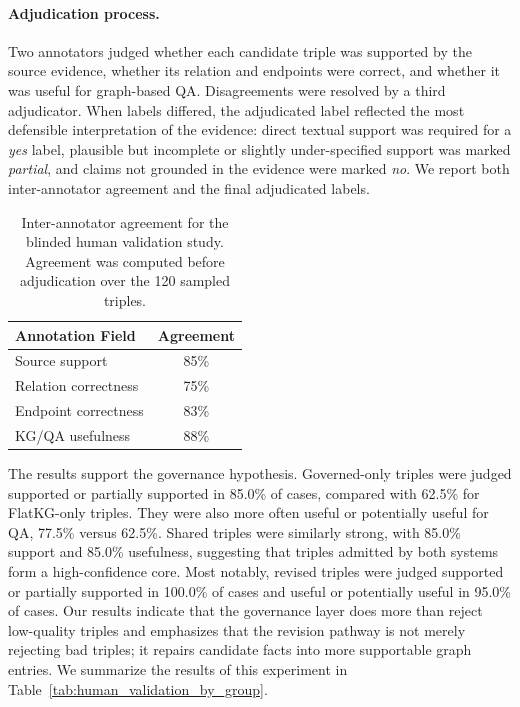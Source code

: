 \documentclass{article}
\begin{document}
\paragraph{Adjudication process.}
Two annotators judged whether each candidate triple was supported by the source evidence, whether its relation and endpoints were correct, and whether it was useful for graph-based QA. Disagreements were resolved by a third adjudicator. When labels differed, the adjudicated label reflected the most defensible interpretation of the evidence: direct textual support was required for a \emph{yes} label, plausible but incomplete or slightly under-specified support was marked \emph{partial}, and claims not grounded in the evidence were marked \emph{no}. We report both inter-annotator agreement and the final adjudicated labels.

\begin{table}[t]
    \centering
    \small
    \caption{
    Inter-annotator agreement for the blinded human validation study. 
    Agreement was computed before adjudication over the 120 sampled triples.
    }
    \begin{tabular}{lc}
        \toprule
        \textbf{Annotation Field} & \textbf{Agreement} \\
        \midrule
        Source support & 85\% \\
        Relation correctness & 75\% \\
        Endpoint correctness & 83\% \\
        KG/QA usefulness & 88\% \\
        \bottomrule
        \end{tabular}
    \label{tab:human_validation_agreement}
\end{table}

The results support the governance hypothesis. Governed-only triples were judged supported or partially supported in 85.0\% of cases, compared with 62.5\% for FlatKG-only triples. They were also more often useful or potentially useful for QA, 77.5\% versus 62.5\%. Shared triples were similarly strong, with 85.0\% support and 85.0\% usefulness, suggesting that triples admitted by both systems form a high-confidence core. Most notably, revised triples were judged supported or partially supported in 100.0\% of cases and useful or potentially useful in 95.0\% of cases. Our results indicate that the governance layer does more than reject low-quality triples and emphasizes that the revision pathway is not merely rejecting bad triples; it repairs candidate facts into more supportable graph entries. We summarize the results of this experiment in Table~\ref{tab:human_validation_by_group}.
\end{document}
